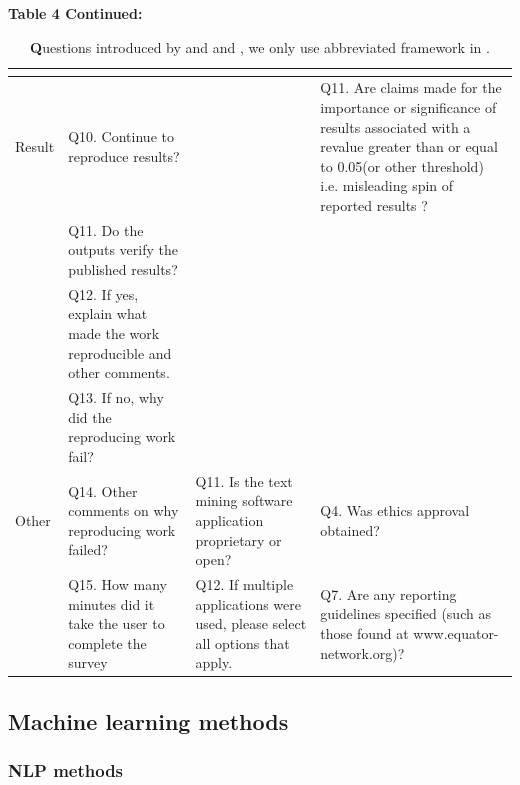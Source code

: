 \documentclass[12pt, a4paper, twocolumn]{article}
\begin{document}
	\begin{table}[]
	\centering
	\caption[]{\textbf Questions introduced by \citet{stagge2019assessing} and  \citet{mcintosh2017repeat} and \citet{QualityOutputChecklist}, we only use abbreviated framework in \citet{mcintosh2017repeat}. }\label{tab:survey_table_3}{\textbf{Table 4 Continued:}}
	\begin{tabular}{>{\raggedright\arraybackslash}p{}>{\raggedright\arraybackslash}p{} >{\raggedright\arraybackslash}p{}>{\raggedright\arraybackslash}p{}}  
	\hline
&	\citet{stagge2019assessing}                                                                           & \citet{mcintosh2017repeat}        					 &\citet{QualityOutputChecklist}                   \\ 
\hline
Result 
&Q10. Continue to reproduce results?& &Q11. Are claims made for the importance or significance of results associated with a revalue greater than or equal to 0.05(or other threshold) i.e. misleading spin of reported results ? \\
&Q11. Do the outputs verify the published results? 		&&\\
&Q12. If yes, explain what made the work reproducible and other comments. 	&&\\
&Q13. If no, why did the reproducing work fail?&&\\
\hline
Other &Q14. Other comments on why reproducing work failed?         &Q11. Is the text mining software application proprietary or open?&Q4. Was ethics approval obtained?              \\     
&Q15. How many minutes did it take the user to complete the survey  &Q12. If multiple applications were used, please select all options that apply.    &Q7. Are any reporting guidelines specified (such as those found at www.equator-network.org)?     \\                  
\hline

	\end{tabular}
	\end{table}


		\subsection{Machine learning methods}\label{sec:ML_methods}

			\subsubsection{NLP methods}\label{sec:NLP_methods}
			
\end{document}
